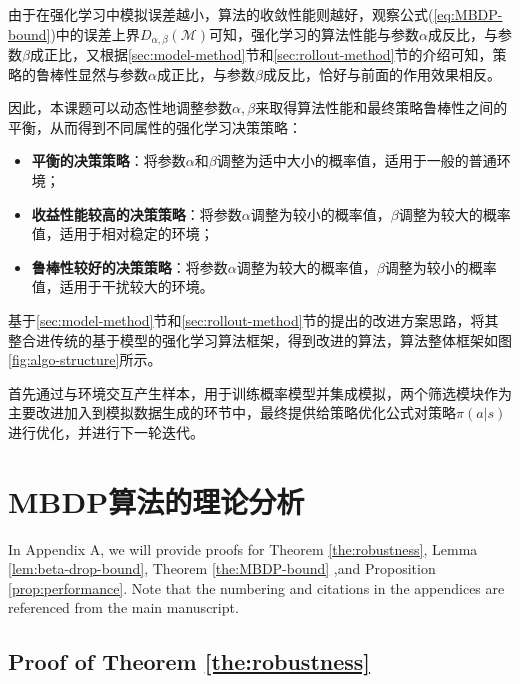 由于在强化学习中模拟误差越小，算法的收敛性能则越好，观察公式(\ref{eq:MBDP-bound})中的误差上界$D_{\alpha,\beta}(\mathcal{M})$可知，强化学习的算法性能与参数$\alpha$成反比，与参数$\beta$成正比，又根据\ref{sec:model-method}节和\ref{sec:rollout-method}节的介绍可知，策略的鲁棒性显然与参数$\alpha$成正比，与参数$\beta$成反比，恰好与前面的作用效果相反。

因此，本课题可以动态性地调整参数$\alpha,\beta$来取得算法性能和最终策略鲁棒性之间的平衡，从而得到不同属性的强化学习决策策略：

\begin{itemize}
    \item \textbf{平衡的决策策略}：将参数$\alpha$和$\beta$调整为适中大小的概率值，适用于一般的普通环境；
    \item \textbf{收益性能较高的决策策略}：将参数$\alpha$调整为较小的概率值，$\beta$调整为较大的概率值，适用于相对稳定的环境；
    \item \textbf{鲁棒性较好的决策策略}：将参数$\alpha$调整为较大的概率值，$\beta$调整为较小的概率值，适用于干扰较大的环境。
\end{itemize}

基于\ref{sec:model-method}节和\ref{sec:rollout-method}节的提出的改进方案思路，将其整合进传统的基于模型的强化学习算法框架，得到改进的算法，算法整体框架如图\ref{fig:algo-structure}所示。

首先通过与环境交互产生样本，用于训练概率模型并集成模拟，两个筛选模块作为主要改进加入到模拟数据生成的环节中，最终提供给策略优化公式对策略$\pi(a|s)$进行优化，并进行下一轮迭代。

\section{MBDP算法的理论分析}

In Appendix A, we will provide proofs for Theorem \ref{the:robustness}, Lemma \ref{lem:beta-drop-bound}, Theorem \ref{the:MBDP-bound} ,and Proposition \ref{prop:performance}. Note that the numbering and citations in the appendices are referenced from the main manuscript.

\subsection{Proof of Theorem \ref{the:robustness}}

